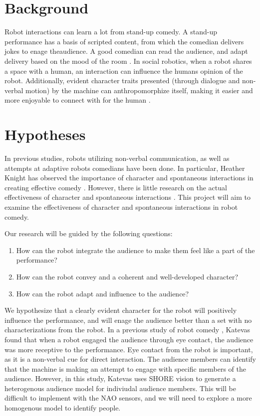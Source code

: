 \documentclass[onecolumn, draftclsnofoot,10pt, compsoc]{IEEEtran}
\begin{document}
\section{Background}
Robot interactions can learn a lot from stand-up comedy. A stand-up performance has a basis of scripted content, from which the comedian delivers jokes to enage theaudience. A good comedian can read the audience, and adapt delivery based on the mood of the room \cite{talkingFunny}. In social robotics, when a robot shares a space with a human, an interaction can influence the humans opinion of the robot. Additionally, evident character traits presented (through dialogue and non-verbal motion) by the machine can anthropomorphize itself, making it easier and more enjoyable to connect with for the human \cite{KnightEightLessons:2011}.



\section{Hypotheses}
In previous studies, robots utilizing non-verbal communication, as well as attempts at adaptive robots comedians have been done. In particular, Heather Knight has observed the importance of character and spontaneous interactions in creating effective comedy \cite{KnightEightLessons:2011}. However, there is little research on the actual effectiveness of character and spontaneous interactions \cite{KatevasRobot:2014}. This project will aim to examine the effectiveness of character and spontaneous interactions in robot comedy.

Our research will be guided by the following questions:
\begin{enumerate}[\IEEEsetlabelwidth{6)}]
\item How can the robot integrate the audience to make them feel like a part of the performance?
\item How can the robot convey and a coherent and well-developed character?
\item How can the robot adapt and influence to the audience?
\end{enumerate}

We hypothesize that a clearly evident character for the robot will positively influence the performance, and will enage the audience better than a set with no characterizations from the robot. In a previous study of robot comedy \cite{RobotComedyLab:2015}, Katevas found that when a robot engaged the audience through eye contact, the audience was more receptive to the performance. Eye contact from the robot is important, as it is a non-verbal cue for direct interaction. The audience members can identify that the machine is making an attempt to engage with specific members of the audience. However, in this study, Katevas uses SHORE vision \cite{SHORE} to generate a heterogenous audience model for indiviudal audience members. This will be difficult to implement with the NAO sensors, and we will need to explore a more homogenous model to identify people.
\end{document}
